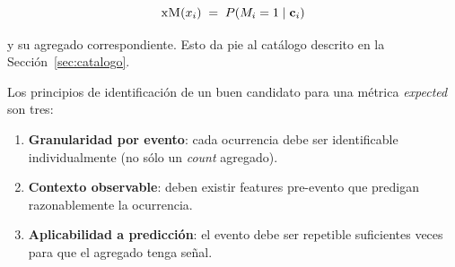 \[
  \mathrm{x}\textsc{M}(x_i) \;=\; P(M_i = 1 \mid \mathbf{c}_i)
\]

\noindent
y su agregado correspondiente. Esto da pie al catálogo descrito en la Sección~\ref{sec:catalogo}.

Los principios de identificación de un buen candidato para una métrica \emph{expected} son tres:

\begin{enumerate}[label=\textbf{P\arabic*.}]
  \item \textbf{Granularidad por evento}: cada ocurrencia debe ser identificable individualmente (no sólo un \emph{count} agregado).
  \item \textbf{Contexto observable}: deben existir features pre-evento que predigan razonablemente la ocurrencia.
  \item \textbf{Aplicabilidad a predicción}: el evento debe ser repetible suficientes veces para que el agregado tenga señal.
\end{enumerate}
